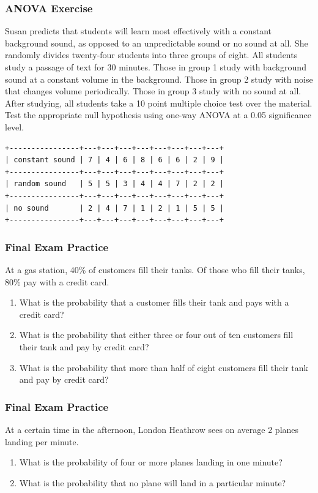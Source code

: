\documentclass[xcolor=dvipsnames]{beamer}
\begin{document}
\begin{frame}[fragile]
  \frametitle{ANOVA Exercise}
  {\ubung} Susan predicts that students will learn most effectively
  with a constant background sound, as opposed to an unpredictable
  sound or no sound at all. She randomly divides twenty-four students
  into three groups of eight. All students study a passage of text for
  30 minutes. Those in group 1 study with background sound at a
  constant volume in the background. Those in group 2 study with noise
  that changes volume periodically. Those in group 3 study with no
  sound at all. After studying, all students take a 10 point multiple
  choice test over the material. Test the appropriate null hypothesis
  using one-way ANOVA at a 0.05 significance level.

\begin{footnotesize}
\begin{verbatim}
+----------------+---+---+---+---+---+---+---+---+
| constant sound | 7 | 4 | 6 | 8 | 6 | 6 | 2 | 9 |
+----------------+---+---+---+---+---+---+---+---+
| random sound   | 5 | 5 | 3 | 4 | 4 | 7 | 2 | 2 |
+----------------+---+---+---+---+---+---+---+---+
| no sound       | 2 | 4 | 7 | 1 | 2 | 1 | 5 | 5 |
+----------------+---+---+---+---+---+---+---+---+
\end{verbatim}
\end{footnotesize}
\end{frame}

\begin{frame}
  \frametitle{Final Exam Practice}
  {\ubung} At a gas station, 40\% of customers fill their tanks. Of
  those who fill their tanks, 80\% pay with a credit card.
  \begin{enumerate}
  \item What is the probability that a customer fills their tank and
    pays with a credit card?
  \item What is the probability that either three or four out of ten
    customers fill their tank and pay by credit card?
  \item What is the probability that more than half of eight customers
    fill their tank and pay by credit card?
  \end{enumerate}
\end{frame}

\begin{frame}
  \frametitle{Final Exam Practice}
  {\ubung} At a certain time in the afternoon, London Heathrow sees on average 2
  planes landing per minute.
  \begin{enumerate}
  \item What is the probability of four or more planes landing in one
    minute?
  \item What is the probability that no plane will land in a
    particular minute?
  \end{enumerate}
\end{frame}
\end{document}

